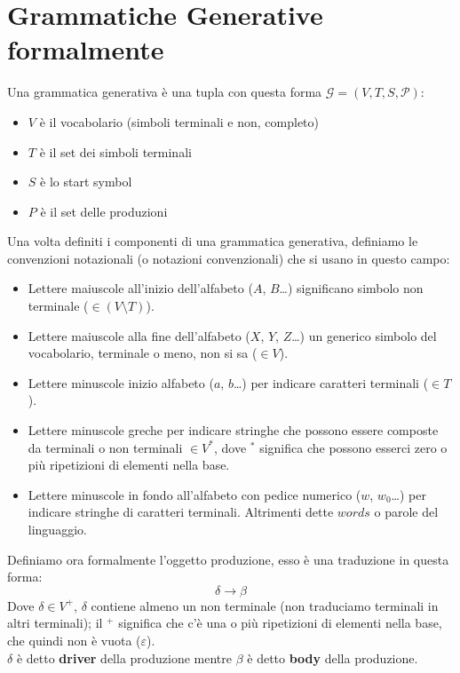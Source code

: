 \documentclass[class=book, crop=false, oneside, 12pt]{standalone}
\begin{document}
\section{Grammatiche Generative formalmente}
Una grammatica generativa è una tupla con questa forma \(\mathcal{G}=(V, T, S, \mathcal{P})\):
\begin{itemize}
    \item \(V\) è il vocabolario (simboli terminali e non, completo)
    \item \(T\) è il set dei simboli terminali
    \item \(S\) è lo start symbol
    \item \(P\) è il set delle produzioni
\end{itemize}
Una volta definiti i componenti di una grammatica generativa, definiamo le convenzioni notazionali (o notazioni convenzionali) che si usano in questo campo:
\begin{itemize}
    \item Lettere maiuscole all’inizio dell’alfabeto (\(A\), \(B\)…) significano simbolo non terminale (\(\in (V \setminus T)\)).
    \item Lettere maiuscole alla fine dell’alfabeto (\(X\), \(Y\), \(Z\)…) un generico simbolo del vocabolario, terminale o meno, non si sa (\(\in V\)).
    \item Lettere minuscole inizio alfabeto (\(a\), \(b\)…) per indicare caratteri terminali (\(\in T\)).
    \item Lettere minuscole greche per indicare stringhe che possono essere composte da terminali o non terminali \(\in V^*\), dove \(^*\) significa che possono esserci zero o più ripetizioni di elementi nella base.
    \item Lettere minuscole in fondo all’alfabeto con pedice numerico (\(w\), \(w_0\)…) per indicare stringhe di caratteri terminali. Altrimenti dette \(words\) o parole del linguaggio. 
\end{itemize}
Definiamo ora formalmente l'oggetto produzione, esso è una traduzione in questa forma:
\begin{equation}
    \delta \to \beta
\end{equation}
Dove \(\delta \in V^+\), \(\delta\) contiene almeno un non terminale (non traduciamo terminali in altri terminali); il \(^+\) significa che c’è una o più ripetizioni di elementi nella base, che quindi non è vuota (\(\varepsilon\)).\\
\(\delta\) è detto \textbf{driver} della produzione mentre \(\beta\) è detto \textbf{body} della produzione.
\end{document}
